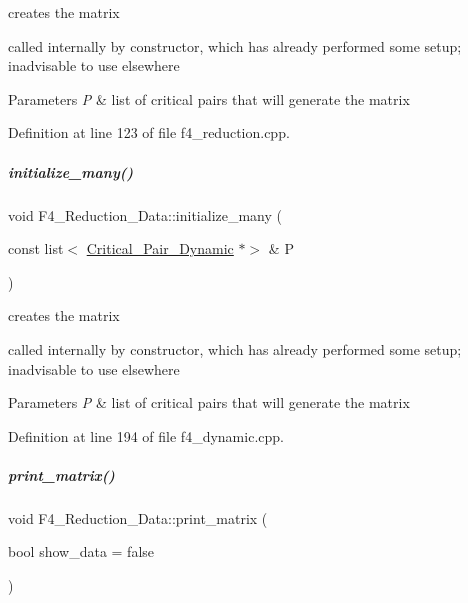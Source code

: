 creates the matrix 

called internally by constructor, which has already performed some setup; inadvisable to use elsewhere 
\begin{DoxyParams}{Parameters}
{\em P} & list of critical pairs that will generate the matrix \\
\hline
\end{DoxyParams}


Definition at line 123 of file f4\+\_\+reduction.\+cpp.

\mbox{\label{group___g_b_computation_a9fa6a212375b9498ca86a2c18e94ca1e}} 
\subparagraph{\texorpdfstring{initialize\+\_\+many()}{initialize\_many()}\hspace{0.1cm}{\footnotesize\ttfamily [3/3]}}
{\footnotesize\ttfamily void F4\+\_\+\+Reduction\+\_\+\+Data\+::initialize\+\_\+many (\begin{DoxyParamCaption}\item[{const list$<$ \hyperlink{group___g_b_computation_class_critical___pair___dynamic}{Critical\+\_\+\+Pair\+\_\+\+Dynamic} $\ast$$>$ \&}]{P }\end{DoxyParamCaption})}



creates the matrix 

called internally by constructor, which has already performed some setup; inadvisable to use elsewhere 
\begin{DoxyParams}{Parameters}
{\em P} & list of critical pairs that will generate the matrix \\
\hline
\end{DoxyParams}


Definition at line 194 of file f4\+\_\+dynamic.\+cpp.

\mbox{\label{group___g_b_computation_a9f3e9b5617084c34f97acd23d6e67a43}} 
\subparagraph{\texorpdfstring{print\+\_\+matrix()}{print\_matrix()}\hspace{0.1cm}{\footnotesize\ttfamily [1/3]}}
{\footnotesize\ttfamily void F4\+\_\+\+Reduction\+\_\+\+Data\+::print\+\_\+matrix (\begin{DoxyParamCaption}\item[{bool}]{show\+\_\+data = {\ttfamily false} }\end{DoxyParamCaption})}



